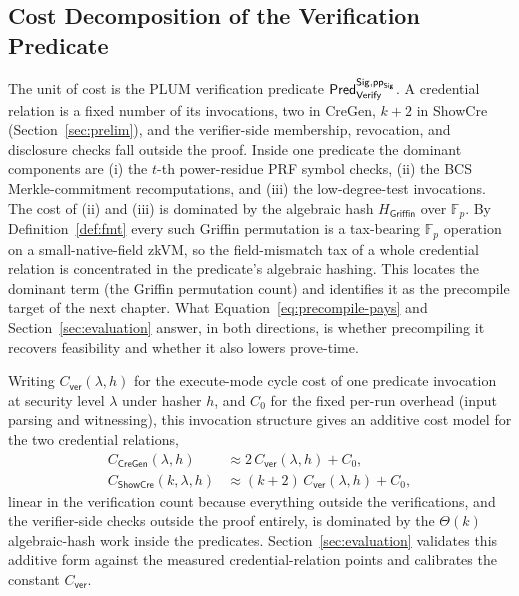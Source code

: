 \subsection{Cost Decomposition of the Verification Predicate}\label{ssec:cost-decomposition}
The unit of cost is the PLUM verification predicate $\mathsf{Pred}_{\mathsf{Verify}}^{\mathsf{Sig},\mathsf{pp}_{\mathsf{Sig}}}$. A credential relation is a fixed number of its invocations, two in CreGen, $k+2$ in ShowCre (Section~\ref{sec:prelim}), and the verifier-side membership, revocation, and disclosure checks fall outside the proof. Inside one predicate the dominant components are (i) the $t$-th power-residue PRF symbol checks, (ii) the BCS Merkle-commitment recomputations, and (iii) the low-degree-test invocations. The cost of (ii) and (iii) is dominated by the algebraic hash $H_{\mathsf{Griffin}}$ over $\mathbb{F}_p$. By Definition~\ref{def:fmt} every such Griffin permutation is a tax-bearing $\mathbb{F}_p$ operation on a small-native-field zkVM, so the field-mismatch tax of a whole credential relation is concentrated in the predicate's algebraic hashing. This locates the dominant term (the Griffin permutation count) and identifies it as the precompile target of the next chapter. What Equation~\eqref{eq:precompile-pays} and Section~\ref{sec:evaluation} answer, in both directions, is whether precompiling it recovers feasibility and whether it also lowers prove-time.

Writing $C_{\mathsf{ver}}(\lambda,h)$ for the execute-mode cycle cost of one predicate invocation at security level $\lambda$ under hasher $h$, and $C_0$ for the fixed per-run overhead (input parsing and witnessing), this invocation structure gives an additive cost model for the two credential relations,
\begin{align}
  C_{\mathsf{CreGen}}(\lambda,h) &\approx 2\,C_{\mathsf{ver}}(\lambda,h) + C_0,
  \label{eq:cost-cregen}\\
  C_{\mathsf{ShowCre}}(k,\lambda,h) &\approx (k+2)\,C_{\mathsf{ver}}(\lambda,h) + C_0,
  \label{eq:cost-showcre}
\end{align}
linear in the verification count because everything outside the verifications, and the verifier-side checks outside the proof entirely, is dominated by the $\Theta(k)$ algebraic-hash work inside the predicates. Section~\ref{sec:evaluation} validates this additive form against the measured credential-relation points and calibrates the constant $C_{\mathsf{ver}}$.
